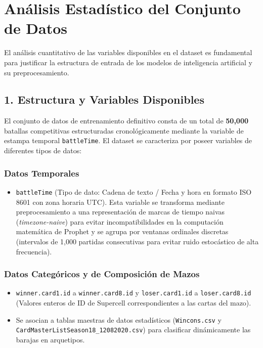 \documentclass[
  spanish,
  12pt,
]{report}
\providecommand{\tightlist}{%
  \setlength{\itemsep}{0pt}\setlength{\parskip}{0pt}}
\begin{document}
\chapter{Análisis Estadístico del Conjunto de
Datos}\label{anuxe1lisis-estaduxedstico-del-conjunto-de-datos}

El análisis cuantitativo de las variables disponibles en el dataset es
fundamental para justificar la estructura de entrada de los modelos de
inteligencia artificial y su preprocesamiento.

\section{1. Estructura y Variables
Disponibles}\label{estructura-y-variables-disponibles}

El conjunto de datos de entrenamiento definitivo consta de un total de
\textbf{50,000} batallas competitivas estructuradas cronológicamente
mediante la variable de estampa temporal \texttt{battleTime}. El dataset
se caracteriza por poseer variables de diferentes tipos de datos:

\subsection{Datos Temporales}\label{datos-temporales}

\begin{itemize}
\tightlist
\item
  \texttt{battleTime} (Tipo de dato: Cadena de texto / Fecha y hora en
  formato ISO 8601 con zona horaria UTC). Esta variable se transforma
  mediante preprocesamiento a una representación de marcas de tiempo
  naivas (\emph{timezone-naive}) para evitar incompatibilidades en la
  computación matemática de Prophet y se agrupa por ventanas ordinales
  discretas (intervalos de 1,000 partidas consecutivas para evitar ruido
  estocástico de alta frecuencia).
\end{itemize}

\subsection{Datos Categóricos y de Composición de
Mazos}\label{datos-categuxf3ricos-y-de-composiciuxf3n-de-mazos}

\begin{itemize}
\tightlist
\item
  \texttt{winner.card1.id} a \texttt{winner.card8.id} y
  \texttt{loser.card1.id} a \texttt{loser.card8.id} (Valores enteros de
  ID de Supercell correspondientes a las cartas del mazo).
\item
  Se asocian a tablas maestras de datos estadísticos
  (\texttt{Wincons.csv} y \texttt{CardMasterListSeason18\_12082020.csv})
  para clasificar dinámicamente las barajas en arquetipos.
\end{itemize}
\end{document}
